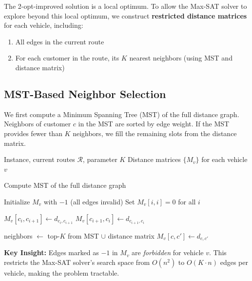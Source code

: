 \documentclass[12pt,a4paper]{article}
\theoremstyle{definition}
\begin{document}
The 2-opt-improved solution is a local optimum. To allow the Max-SAT solver to explore beyond this local optimum, we construct \textbf{restricted distance matrices} for each vehicle, including:
\begin{enumerate}
    \item All edges in the current route
    \item For each customer in the route, its $K$ nearest neighbors (using MST and distance matrix)
\end{enumerate}

\subsection{MST-Based Neighbor Selection}

We first compute a Minimum Spanning Tree (MST) of the full distance graph. Neighbors of customer $c$ in the MST are sorted by edge weight. If the MST provides fewer than $K$ neighbors, we fill the remaining slots from the distance matrix.

\begin{algorithm}[H]
\caption{K-Nearest Neighbors Matrix Construction}
\begin{algorithmic}[1]
\Require Instance, current routes $\mathcal{R}$, parameter $K$
\Ensure Distance matrices $\{M_v\}$ for each vehicle $v$

\State Compute MST of the full distance graph

    \State Initialize $M_v$ with $-1$ (all edges invalid)
    \State Set $M_v[i,i] = 0$ for all $i$
    
        \State $M_v[c_i, c_{i+1}] \gets d_{c_i, c_{i+1}}$
        \State $M_v[c_{i+1}, c_i] \gets d_{c_{i+1}, c_i}$
    \EndFor
    
        \State neighbors $\gets$ top-$K$ from MST $\cup$ distance matrix
            \State $M_v[c, c'] \gets d_{c, c'}$
        \EndFor
    \EndFor
\EndFor
\end{algorithmic}
\end{algorithm}

\textbf{Key Insight:} Edges marked as $-1$ in $M_v$ are \emph{forbidden} for vehicle $v$. This restricts the Max-SAT solver's search space from $O(n^2)$ to $O(K \cdot n)$ edges per vehicle, making the problem tractable.
\end{document}
